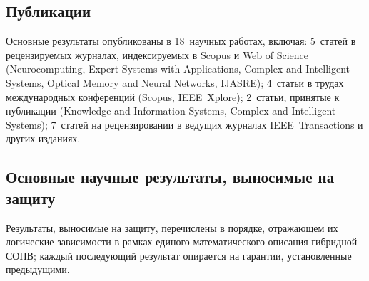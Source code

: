 \documentclass[12pt,a5paper]{article}
\begin{document}
\subsection*{Публикации}

Основные результаты опубликованы в 18~научных работах,
включая: 5~статей в рецензируемых журналах, индексируемых в
Scopus и Web of Science (Neurocomputing, Expert Systems with
Applications, Complex and Intelligent Systems, Optical Memory
and Neural Networks, IJASRE); 4~статьи в трудах международных
конференций (Scopus, IEEE~Xplore); 2~статьи, принятые к
публикации (Knowledge and Information Systems, Complex and
Intelligent Systems); 7~статей на рецензировании в ведущих
журналах IEEE~Transactions и других изданиях.

\subsection*{Основные научные результаты, выносимые на защиту}

Результаты, выносимые на защиту, перечислены в порядке,
отражающем их логические зависимости в рамках единого
математического описания гибридной СОПВ; каждый последующий
результат опирается на гарантии, установленные предыдущими.
\end{document}
